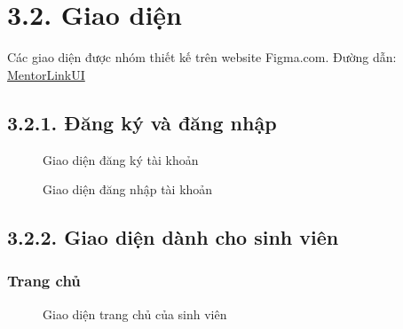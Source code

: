 \section*{3.2. Giao diện}
Các giao diện được nhóm thiết kế trên website Figma.com. Đường dẫn: \href{https://www.figma.com/design/JVJlph8kWxybLC45mcYPDN/BTL-CNPM?node-id=0-1&t=kgGeKYXHL2xgpn6x-1}{MentorLinkUI}
\subsection*{3.2.1. Đăng ký và đăng nhập}
\begin{figure}[H]
    \centering
    \setlength{\fboxsep}{2pt}      %
    \setlength{\fboxrule}{0.5pt}   %
    \caption{Giao diện đăng ký tài khoản}
\end{figure}
\begin{figure}[H]
    \centering
    \setlength{\fboxsep}{2pt}      
    \setlength{\fboxrule}{0.5pt}   
    \caption{Giao diện đăng nhập tài khoản}
\end{figure}

\newpage
\subsection*{3.2.2. Giao diện dành cho sinh viên}
\subsubsection*{Trang chủ}
\begin{figure}[H]
    \centering
    \setlength{\fboxsep}{2pt}     
    \setlength{\fboxrule}{0.5pt}   
    \caption{Giao diện trang chủ của sinh viên}
\end{figure}

